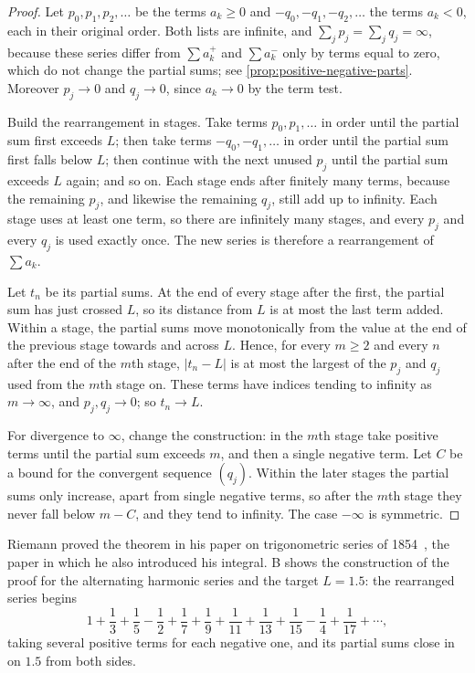 \begin{proof}
Let $p_0,p_1,p_2,\ldots$ be the terms $a_k\ge0$ and $-q_0,-q_1,-q_2,\ldots$ the terms $a_k<0$, each in their original order. Both lists are infinite, and $\sum_jp_j=\sum_jq_j=\infty$, because these series differ from $\sum a_k^+$ and $\sum a_k^-$ only by terms equal to zero, which do not change the partial sums; see \cref{prop:positive-negative-parts}. Moreover $p_j\to0$ and $q_j\to0$, since $a_k\to0$ by the term test.

Build the rearrangement in stages. Take terms $p_0,p_1,\ldots$ in order until the partial sum first exceeds $L$; then take terms $-q_0,-q_1,\ldots$ in order until the partial sum first falls below $L$; then continue with the next unused $p_j$ until the partial sum exceeds $L$ again; and so on. Each stage ends after finitely many terms, because the remaining $p_j$, and likewise the remaining $q_j$, still add up to infinity. Each stage uses at least one term, so there are infinitely many stages, and every $p_j$ and every $q_j$ is used exactly once. The new series is therefore a rearrangement of $\sum a_k$.

Let $t_n$ be its partial sums. At the end of every stage after the first, the partial sum has just crossed $L$, so its distance from $L$ is at most the last term added. Within a stage, the partial sums move monotonically from the value at the end of the previous stage towards and across $L$. Hence, for every $m\ge2$ and every $n$ after the end of the $m$th stage, $|t_n-L|$ is at most the largest of the $p_j$ and $q_j$ used from the $m$th stage on. These terms have indices tending to infinity as $m\to\infty$, and $p_j,q_j\to0$; so $t_n\to L$.

For divergence to $\infty$, change the construction: in the $m$th stage take positive terms until the partial sum exceeds $m$, and then a single negative term. Let $C$ be a bound for the convergent sequence $(q_j)$. Within the later stages the partial sums only increase, apart from single negative terms, so after the $m$th stage they never fall below $m-C$, and they tend to infinity. The case $-\infty$ is symmetric.
\end{proof}

Riemann proved the theorem in his paper on trigonometric series of 1854~\cite{riemann1867}, the paper in which he also introduced his integral. B shows the construction of the proof for the alternating harmonic series and the target $L=1.5$: the rearranged series begins
\[
1+\frac13+\frac15-\frac12+\frac17+\frac19+\frac1{11}+\frac1{13}+\frac1{15}-\frac14+\frac1{17}+\cdots,
\]
taking several positive terms for each negative one, and its partial sums close in on $1.5$ from both sides.

